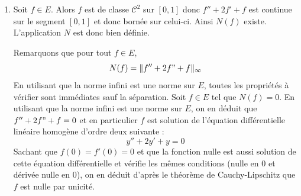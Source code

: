 \documentclass[a4paper,10pt]{report}
\begin{document}
\corr 
\begin{enumerate}
\item Soit $f \in E$. Alors $f$ est de classe $\mathcal{C}^2$ sur $[0,1]$ donc $f''+2f'+f$ est continue sur le segment $[0,1]$ et donc bornée sur celui-ci. Ainsi $N(f)$ existe. L'application $N$ est donc bien définie.

\medskip

\noindent Remarquons que pour tout $f \in E$,
$$ N(f) = \Vert f''+2f"+f \Vert_{\infty}$$
En utilisant que la norme infini est une norme sur $E$, toutes les propriétés à vérifier sont immédiates sauf la séparation. Soit $f \in E$ tel que $N(f)=0$. En utilisant que la norme infini est une norme sur $E$, on en déduit que $f''+2f"+f=0$ et en particulier $f$ est solution de l'équation différentielle linéaire homogène d'ordre deux suivante :
$$ y''+ 2y'+y = 0$$
Sachant que $f(0)=f'(0)=0$ et que la fonction nulle est aussi solution de cette équation différentielle et vérifie les mêmes conditions (nulle en $0$ et dérivée nulle en $0$), on en déduit d'après le théorème de Cauchy-Lipschitz que $f$ est nulle par unicité.


\end{enumerate}
\end{document}
